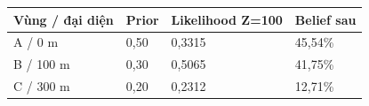 \par\smallskip\noindent\begin{tabularx}{\linewidth}{@{}XXXX@{}}\toprule
\textbf{Vùng / đại diện} & \textbf{Prior} & \textbf{Likelihood Z=100} & \textbf{Belief sau} \\
\midrule
A / 0 m & 0{,}50 & 0{,}3315 & 45{,}54\% \\
B / 100 m & 0{,}30 & 0{,}5065 & 41{,}75\% \\
C / 300 m & 0{,}20 & 0{,}2312 & 12{,}71\% \\
\bottomrule\end{tabularx}\par\smallskip

